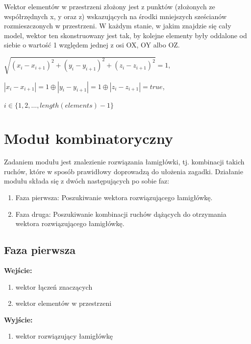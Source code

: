 Wektor elementów w przestrzeni złożony jest z punktów (złożonych ze współrzędnych x, y oraz z) wskazujących na środki mniejszych sześcianów rozmieszczonych w przestrzeni. W każdym stanie, w jakim znajdzie się cały model, wektor ten skonstruowany jest tak, by kolejne elementy były oddalone od siebie o wartość 1 względem jednej z osi OX, OY albo OZ.

\begin{center}
$\sqrt{(x_i - x_{i+1})^2 + (y_i - y_{i+1})^2 + (z_i - z_{i+1})^2} = 1$,

$|x_i - x_{i+1}| = 1  \oplus  |y_i - y_{i+1}| = 1  \oplus  |z_i - z_{i+1}| = true$,

$i \in \{ 1, 2, \ldots, length(elements)-1 \}$
\end{center}

\section{Moduł kombinatoryczny}
Zadaniem modułu jest znalezienie rozwiązania łamigłówki, tj. kombinacji takich ruchów, które w sposób prawidłowy doprowadzą do ułożenia zagadki. Działanie modułu składa się z dwóch następujących po sobie faz:

\begin{enumerate}
\item Faza pierwsza: Poszukiwanie wektora rozwiązującego łamigłówkę.
\item Faza druga: Poszukiwanie kombinacji ruchów dążących do otrzymania wektora rozwiązującego łamigłówkę.
\end{enumerate}

\subsection{Faza pierwsza}
\textbf{Wejście:}
\begin{enumerate}
\item wektor łączeń znaczących
\item wektor elementów w przestrzeni
\end{enumerate}

\textbf{Wyjście:}
\begin{enumerate}
\item wektor rozwiązujący łamigłówkę
\end{enumerate}

